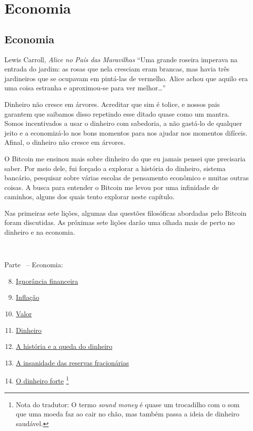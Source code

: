 \part{Economia}
\label{ch:economics}
\chapter*{Economia}

\begin{chapquote}{Lewis Carroll, \textit{Alice no País das Maravilhas}}
\enquote{Uma grande roseira imperava na entrada do jardim: as rosas que nela cresciam eram brancas, mas havia três jardineiros que se ocupavam em pintá-las de vermelho. Alice achou que aquilo era uma coisa estranha e aproximou-se para ver melhor\ldots}
\end{chapquote}

Dinheiro não cresce em árvores. Acreditar que sim é tolice, e nossos pais garantem que saibamos disso repetindo esse ditado quase como um mantra. Somos incentivados a usar o dinheiro com sabedoria, a não gastá-lo de qualquer jeito e a economizá-lo nos bons momentos para nos ajudar nos momentos difíceis. Afinal, o dinheiro não cresce em árvores.

O Bitcoin me ensinou mais sobre dinheiro do que eu jamais pensei que precisaria saber. Por meio dele, fui forçado a explorar a história do dinheiro, sistema bancário, pesquisar sobre várias escolas de pensamento econômico e muitas outras coisas. A busca para entender o Bitcoin me levou por uma infinidade de caminhos, alguns dos quais tento explorar neste capítulo.

Nas primeiras sete lições, algumas das questões filosóficas abordadas pelo Bitcoin foram discutidas. As próximas sete lições darão uma olhada mais de perto no dinheiro e na economia.

~

\begin{samepage}
Parte~\ref{ch:economics} -- Economia:

\begin{enumerate}
  \setcounter{enumi}{7}
  \item \hyperref[les:8]{Ignorância financeira}
  \item \hyperref[les:9]{Inflação}
  \item \hyperref[les:10]{Valor}
  \item \hyperref[les:11]{Dinheiro}
  \item \hyperref[les:12]{A história e a queda do dinheiro}
  \item \hyperref[les:13]{A insanidade das reservas fracionárias}
  \item \hyperref[les:14]{O dinheiro forte} \footnote{Nota do tradutor: O termo \textit{sound money} é quase um trocadilho com o som que uma moeda faz ao cair no chão, mas também passa a ideia de dinheiro saudável.}
\end{enumerate}
\end{samepage}

